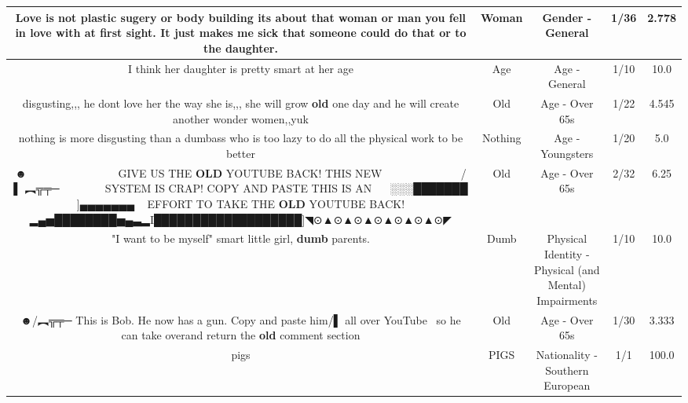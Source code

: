 \documentclass[11pt]{article}
\newlength\mylength
\begin{document}
\begin{center}
\begin{longtable}{|C{.65\mylength}|C{.30\mylength}|C{.12\mylength}|C{.12\mylength}|C{.12\mylength}|}
  \small Love is not plastic sugery or body building its about that \textbf{woman} or man you fell in love with at first sight. It just makes me sick that someone could do that or to the daughter.\normalsize   & Woman & Gender - General & 1/36 & 2.778 \\  \hline
  \small I think her daughter is pretty smart at her age\normalsize   & Age & Age - General & 1/10 & 10.0 \\  \hline
  \small disgusting,,, he dont love her the way she is,,, she will grow \textbf{old} one day and he will create another wonder women,,yuk\normalsize   & Old & Age - Over 65s & 1/22 & 4.545 \\  \hline
  \small nothing is more disgusting than a dumbass who is too lazy to do all the physical work to be better\normalsize   & Nothing & Age - Youngsters & 1/20 & 5.0 \\  \hline
  \small ☻                    GIVE US THE \textbf{OLD} YOUTUBE BACK! THIS NEW                 /▌ ︻╦╤─          SYSTEM IS CRAP! COPY AND PASTE THIS IS AN    ░░░███████ ]▄▄▄▄▄▄▄   EFFORT TO TAKE THE \textbf{OLD} YOUTUBE BACK!▂▄▅████████▅▄▃▂I███████████████████]◥⊙▲⊙▲⊙▲⊙▲⊙▲⊙▲⊙◤\normalsize   & Old & Age - Over 65s & 2/32 & 6.25 \\  \hline
  \small "I want to be myself" smart little girl, \textbf{dumb} parents.\normalsize   & Dumb & Physical Identity - Physical (and Mental) Impairments & 1/10 & 10.0 \\  \hline
  \small ☻/︻╦╤─ This is Bob. He now has a gun. Copy and paste him/▌ all over YouTube \ so he can take overand return the \textbf{old} comment section\normalsize   & Old & Age - Over 65s & 1/30 & 3.333 \\  \hline
  \small pigs\normalsize   & PIGS & Nationality - Southern European & 1/1 & 100.0 \\  \hline

\end{longtable}
\end{center}
\end{document}
